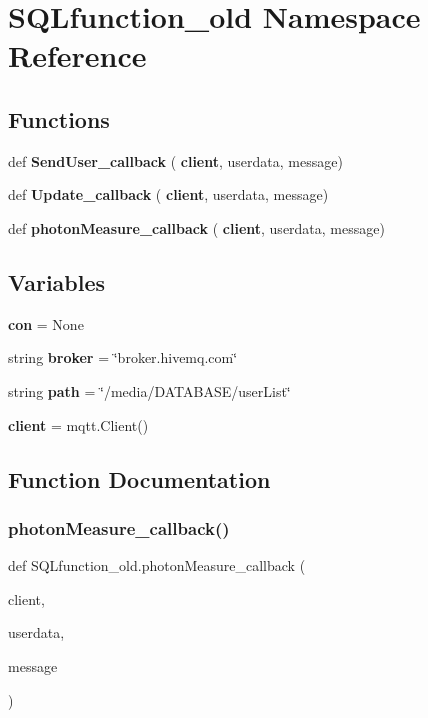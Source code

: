 \section{S\+Q\+Lfunction\+\_\+old Namespace Reference}
\label{namespace_s_q_lfunction__old}
\subsection*{Functions}
\begin{DoxyCompactItemize}
\item 
def \textbf{ Send\+User\+\_\+callback} (\textbf{ client}, userdata, message)
\item 
def \textbf{ Update\+\_\+callback} (\textbf{ client}, userdata, message)
\item 
def \textbf{ photon\+Measure\+\_\+callback} (\textbf{ client}, userdata, message)
\end{DoxyCompactItemize}
\subsection*{Variables}
\begin{DoxyCompactItemize}
\item 
\textbf{ con} = None
\item 
string \textbf{ broker} = \char`\"{}broker.\+hivemq.\+com\char`\"{}
\item 
string \textbf{ path} = \char`\"{}/media/D\+A\+T\+A\+B\+A\+SE/user\+List\char`\"{}
\item 
\textbf{ client} = mqtt.\+Client()
\end{DoxyCompactItemize}


\subsection{Function Documentation}
\mbox{\label{namespace_s_q_lfunction__old_a2fe34bb6a0c80e0b7baf6510b16f13d5}} 
\subsubsection{photon\+Measure\+\_\+callback()}
{\footnotesize\ttfamily def S\+Q\+Lfunction\+\_\+old.\+photon\+Measure\+\_\+callback (\begin{DoxyParamCaption}\item[{}]{client,  }\item[{}]{userdata,  }\item[{}]{message }\end{DoxyParamCaption})}




